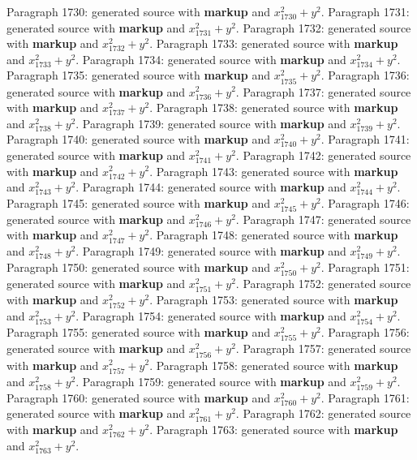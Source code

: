 \documentclass{article}
\begin{document}
Paragraph 1730: generated source with \textbf{markup} and $x_{1730}^2 + y^2$.
Paragraph 1731: generated source with \textbf{markup} and $x_{1731}^2 + y^2$.
Paragraph 1732: generated source with \textbf{markup} and $x_{1732}^2 + y^2$.
Paragraph 1733: generated source with \textbf{markup} and $x_{1733}^2 + y^2$.
Paragraph 1734: generated source with \textbf{markup} and $x_{1734}^2 + y^2$.
Paragraph 1735: generated source with \textbf{markup} and $x_{1735}^2 + y^2$.
Paragraph 1736: generated source with \textbf{markup} and $x_{1736}^2 + y^2$.
Paragraph 1737: generated source with \textbf{markup} and $x_{1737}^2 + y^2$.
Paragraph 1738: generated source with \textbf{markup} and $x_{1738}^2 + y^2$.
Paragraph 1739: generated source with \textbf{markup} and $x_{1739}^2 + y^2$.
Paragraph 1740: generated source with \textbf{markup} and $x_{1740}^2 + y^2$.
Paragraph 1741: generated source with \textbf{markup} and $x_{1741}^2 + y^2$.
Paragraph 1742: generated source with \textbf{markup} and $x_{1742}^2 + y^2$.
Paragraph 1743: generated source with \textbf{markup} and $x_{1743}^2 + y^2$.
Paragraph 1744: generated source with \textbf{markup} and $x_{1744}^2 + y^2$.
Paragraph 1745: generated source with \textbf{markup} and $x_{1745}^2 + y^2$.
Paragraph 1746: generated source with \textbf{markup} and $x_{1746}^2 + y^2$.
Paragraph 1747: generated source with \textbf{markup} and $x_{1747}^2 + y^2$.
Paragraph 1748: generated source with \textbf{markup} and $x_{1748}^2 + y^2$.
Paragraph 1749: generated source with \textbf{markup} and $x_{1749}^2 + y^2$.
Paragraph 1750: generated source with \textbf{markup} and $x_{1750}^2 + y^2$.
Paragraph 1751: generated source with \textbf{markup} and $x_{1751}^2 + y^2$.
Paragraph 1752: generated source with \textbf{markup} and $x_{1752}^2 + y^2$.
Paragraph 1753: generated source with \textbf{markup} and $x_{1753}^2 + y^2$.
Paragraph 1754: generated source with \textbf{markup} and $x_{1754}^2 + y^2$.
Paragraph 1755: generated source with \textbf{markup} and $x_{1755}^2 + y^2$.
Paragraph 1756: generated source with \textbf{markup} and $x_{1756}^2 + y^2$.
Paragraph 1757: generated source with \textbf{markup} and $x_{1757}^2 + y^2$.
Paragraph 1758: generated source with \textbf{markup} and $x_{1758}^2 + y^2$.
Paragraph 1759: generated source with \textbf{markup} and $x_{1759}^2 + y^2$.
Paragraph 1760: generated source with \textbf{markup} and $x_{1760}^2 + y^2$.
Paragraph 1761: generated source with \textbf{markup} and $x_{1761}^2 + y^2$.
Paragraph 1762: generated source with \textbf{markup} and $x_{1762}^2 + y^2$.
Paragraph 1763: generated source with \textbf{markup} and $x_{1763}^2 + y^2$.
\end{document}
